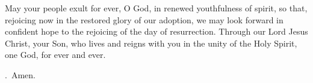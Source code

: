 \lettrine[lines=3]{M}{}ay your people exult for ever, O God,
in renewed youthfulness of spirit,
so that, rejoicing now in the restored glory of our adoption,
we may look forward in confident hope
to the rejoicing of the day of resurrection.
Through our Lord Jesus Christ, your Son,
who lives and reigns with you in the unity of the Holy Spirit,
one God, for ever and ever.
\par \Rbar.~Amen.
